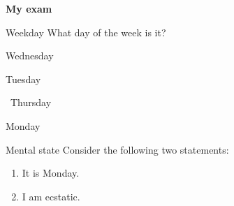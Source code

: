 \documentclass{article}
\begin{document}
  \textbf{My exam}

  \begin{examtronproblem}{Weekday}
    What day of the week is it?
    \begin{examtronchoices}
      \item Wednesday
      \item Tuesday
      \item \correct\ Thursday
      \item Monday
    \end{examtronchoices}
  \end{examtronproblem}

  \begin{examtronproblem}{Mental state}
    Consider the following two statements:
    \begin{enumerate}[(1)]
      \item It is Monday.
      \item I am ecstatic.
    \end{enumerate}
  \end{examtronproblem}
\end{document}
